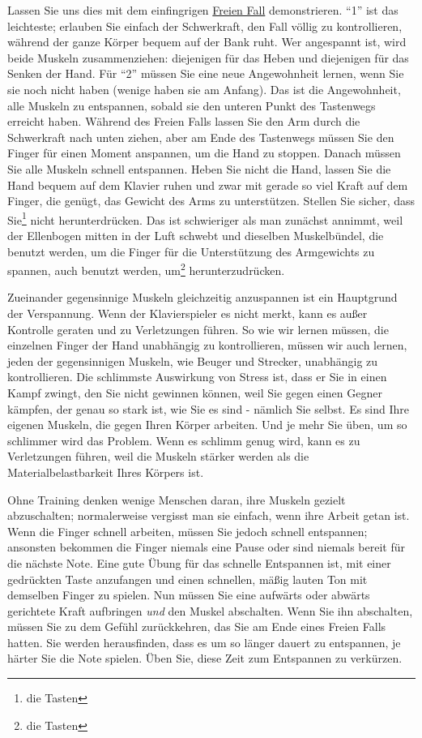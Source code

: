 Lassen Sie uns dies mit dem einfingrigen \hyperref[c1ii10]{Freien Fall} demonstrieren.
\enquote{1} ist das leichteste; erlauben Sie einfach der Schwerkraft, den Fall völlig zu kontrollieren, während der ganze Körper bequem auf der Bank ruht.
Wer angespannt ist, wird beide Muskeln zusammenziehen: diejenigen für das Heben und diejenigen für das Senken der Hand.
Für \enquote{2} müssen Sie eine neue Angewohnheit lernen, wenn Sie sie noch nicht haben (wenige haben sie am Anfang).
Das ist die Angewohnheit, alle Muskeln zu entspannen, sobald sie den unteren Punkt des Tastenwegs erreicht haben.
Während des Freien Falls lassen Sie den Arm durch die Schwerkraft nach unten ziehen, aber am Ende des Tastenwegs müssen Sie den Finger für einen Moment anspannen, um die Hand zu stoppen.
Danach müssen Sie alle Muskeln schnell entspannen.
Heben Sie nicht die Hand, lassen Sie die Hand bequem auf dem Klavier ruhen und zwar mit gerade so viel Kraft auf dem Finger, die genügt, das Gewicht des Arms zu unterstützen.
Stellen Sie sicher, dass Sie\footnote{die Tasten} nicht herunterdrücken.
Das ist schwieriger als man zunächst annimmt, weil der Ellenbogen mitten in der Luft schwebt und dieselben Muskelbündel, die benutzt werden, um die Finger für die Unterstützung des Armgewichts zu spannen, auch benutzt werden, um\footnote{die Tasten} herunterzudrücken.

Zueinander gegensinnige Muskeln gleichzeitig anzuspannen ist ein Hauptgrund der Verspannung.
Wenn der Klavierspieler es nicht merkt, kann es außer Kontrolle geraten und zu Verletzungen führen.
So wie wir lernen müssen, die einzelnen Finger der Hand unabhängig zu kontrollieren, müssen wir auch lernen, jeden der gegensinnigen Muskeln, wie Beuger und Strecker, unabhängig zu kontrollieren.
Die schlimmste Auswirkung von Stress ist, dass er Sie in einen Kampf zwingt, den Sie nicht gewinnen können, weil Sie gegen einen Gegner kämpfen, der genau so stark ist, wie Sie es sind - nämlich Sie selbst.
Es sind Ihre eigenen Muskeln, die gegen Ihren Körper arbeiten. 
Und je mehr Sie üben, um so schlimmer wird das Problem.
Wenn es schlimm genug wird, kann es zu Verletzungen führen, weil die Muskeln stärker werden als die Materialbelastbarkeit Ihres Körpers ist.

Ohne Training denken wenige Menschen daran, ihre Muskeln gezielt abzuschalten; normalerweise vergisst man sie einfach, wenn ihre Arbeit getan ist.
Wenn die Finger schnell arbeiten, müssen Sie jedoch schnell entspannen; ansonsten bekommen die Finger niemals eine Pause oder sind niemals bereit für die nächste Note.
Eine gute Übung für das schnelle Entspannen ist, mit einer gedrückten Taste anzufangen und einen schnellen, mäßig lauten Ton mit demselben Finger zu spielen.
Nun müssen Sie eine aufwärts oder abwärts gerichtete Kraft aufbringen \textit{und} den Muskel abschalten.
Wenn Sie ihn abschalten, müssen Sie zu dem Gefühl zurückkehren, das Sie am Ende eines Freien Falls hatten.
Sie werden herausfinden, dass es um so länger dauert zu entspannen, je härter Sie die Note spielen.
Üben Sie, diese Zeit zum Entspannen zu verkürzen.

